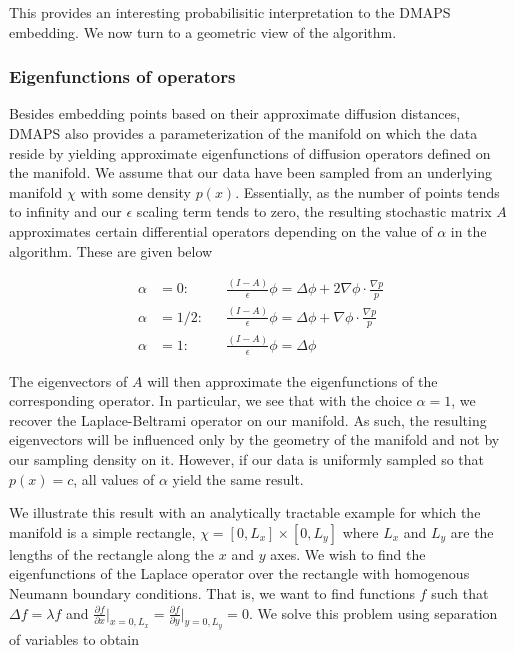 This provides an interesting probabilisitic interpretation to the
DMAPS embedding. We now turn to a geometric view of the algorithm.

\subsubsection{Eigenfunctions of operators}

Besides embedding points based on their approximate diffusion
distances, DMAPS also provides a parameterization of the manifold on
which the data reside by yielding approximate eigenfunctions of
diffusion operators defined on the manifold. We assume that our data
have been sampled from an underlying manifold $\chi$ with some density
$p(x)$. Essentially, as the number of points tends to infinity and our
$\epsilon$ scaling term tends to zero, the resulting stochastic matrix
$A$ approximates certain differential operators depending on the value
of $\alpha$ in the algorithm. These are given below

\begin{equation}
\begin{aligned}
  \alpha &= 0: &&\frac{(I - A)}{\epsilon} \phi = \Delta \phi + 2
    \nabla \phi \cdot \frac{\nabla p}{p} \\
  \alpha &= 1/2: &&\frac{(I - A)}{\epsilon} \phi = \Delta \phi +
    \nabla \phi \cdot \frac{\nabla p}{p} \\
  \alpha &= 1: &&\frac{(I - A)}{\epsilon} \phi = \Delta \phi
\end{aligned}
\end{equation}

The eigenvectors of $A$ will then approximate the eigenfunctions of
the corresponding operator. In particular, we see that with the choice
$\alpha = 1$, we recover the Laplace-Beltrami operator on our
manifold. As such, the resulting eigenvectors will be influenced only
by the geometry of the manifold and not by our sampling density on
it. However, if our data is uniformly sampled so that $p(x) = c$, all
values of $\alpha $ yield the same result.

We illustrate this result with an analytically tractable example for
which the manifold is a simple rectangle, $\chi = [0, L_x] \times [0,
L_y]$ where $L_x$ and $L_y$ are the lengths of the rectangle along the
$x$ and $y$ axes. We wish to find the eigenfunctions of the Laplace
operator over the rectangle with homogenous Neumann boundary
conditions. That is, we want to find functions $f$ such that $\Delta f
= \lambda f$ and $\frac{\partial f}{\partial x}\Big|_{x=0,L_x}
=\frac{\partial f}{\partial y}\Big|_{y=0,L_y} = 0$. We solve this
problem using separation of variables to obtain

